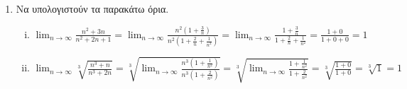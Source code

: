 \begin{enumerate}
\begin{proof}
\begin{enumerate}[i)]
                    \begin{align*}
                        \lim_{n \to \infty} a_{2n-1} = \lim_{n \to \infty} (-1)^{2n-1} 
                        \frac{2n-1 +3}{2 \cdot (2n-1)} = \lim_{n \to \infty} - 
                        \frac{2n+2}{4n-2} = - \lim_{n \to \infty} 
                        \frac{n(2+ \frac{2}{n})}{n(4- \frac{2}{n})} = - \lim_{n \to \infty}
                        \frac{2 + \frac{2}{n}}{4 - \frac{2}{n}} = - \frac{1}{2}
                    \end{align*}

                    Επειδή $ \lim_{n \to \infty} a_{2n} \neq \lim_{n \to \infty} a_{2n-1} $
                    η ακολουθία $ (a_{n})_{n \in \mathbb{N}} $ δε συγκλίνει.

                \item Η ακολουθία $(\lambda n)_{n \in \mathbb{N}} $ δε συγκλίνει, διότι 
                    δεν είναι φραγμένη. Πράγματι, γιατί αν $ (a_{n})_{n \in \mathbb{N}} $
                    είναι φραγμένη, τότε
                    \[
                        \abs{a_{n}} = \abs{\lambda n} \overset{\lambda >0}{=} 
                        \lambda n \leq a, \; \forall n \in \mathbb{N} \Leftrightarrow 
                        n \leq \frac{a}{\lambda}, \; \forall n \in \mathbb{N} \; 
                        \text{άτοπο, γιατι $ \mathbb{N} $ όχι άνω φραγμένο}
                    \] 
            \end{enumerate}    
        \end{proof}

    \item Να υπολογιστούν τα παρακάτω όρια.

        \begin{enumerate}[i)]
            \item $ \lim_{n \to \infty} \frac{n^{2}+3n}{n^{2}+2n+1} = 
                \lim_{n \to \infty} \frac{n^{2}(1+ \frac{3}{n})}{n^{2}(1+ \frac{2}{n} 
                + \frac{1}{n^{2}})} = \lim_{n \to \infty} 
                \frac{1+ \frac{3}{n}}{1+ \frac{2}{n} + \frac{1}{n^{2}}} = 
                \frac{1+0}{1+0+0} = 1 $ 

            \item $ \lim_{n \to \infty} \sqrt[3]{\frac{n^{3}+n}{n^{3}+2n}} = 
                \sqrt[3]{\lim_{n \to \infty} \frac{n^{3}(1+ 
                \frac{1}{n^{2}})}{n^{3}(1+ \frac{2}{n^{2}})}} = 
                \sqrt[3]{\lim_{n \to \infty} \frac{1+ \frac{1}{n^{2}}}{1+
                \frac{2}{n^{2}}}} = \sqrt[3]{\frac{1+0}{1+0}} = \sqrt[3]{1} = 1  $
        \end{enumerate}


\end{enumerate}
